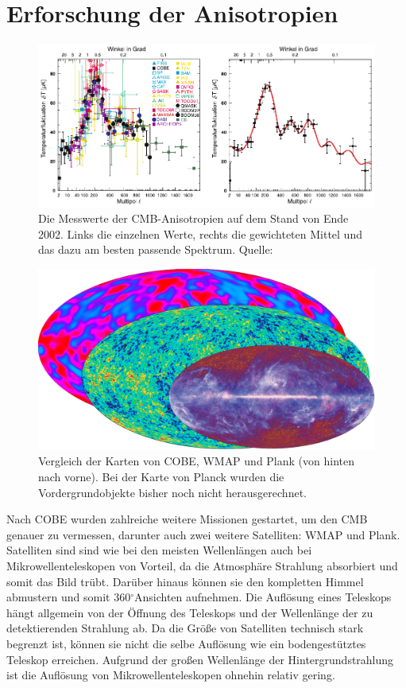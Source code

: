 \documentclass[10pt,a4paper]{article}
\newcommand{\degree}{$^\circ$}
\begin{document}
\section{Erforschung der Anisotropien}\label{Missionen}
\begin{figure}
\center
\includegraphics[scale=0.9]{mess}
\caption{Die Messwerte der CMB-Anisotropien auf dem Stand von Ende 2002. Links die einzelnen Werte, rechts die gewichteten Mittel und das dazu am besten passende Spektrum. Quelle: \cite{Schneider}}
\label{mess}
\end{figure}

\begin{figure}
\center
\includegraphics[scale=0.15]{CMB}
\caption{Vergleich der Karten von COBE, WMAP und Plank (von hinten nach vorne). Bei der Karte von Planck wurden die Vordergrundobjekte bisher noch nicht herausgerechnet.}
\label{cmb}
\end{figure}

Nach COBE wurden zahlreiche weitere Missionen gestartet, um den CMB genauer zu vermessen, darunter auch zwei weitere Satelliten: WMAP und Plank.
Satelliten sind sind wie bei den meisten Wellenlängen auch bei Mikrowellenteleskopen von Vorteil, da die Atmosphäre Strahlung absorbiert und somit das Bild trübt. Darüber hinaus können sie den kompletten Himmel abmustern und somit 360\degree Ansichten aufnehmen. Die Auflösung eines Teleskops hängt allgemein von der Öffnung des Teleskops und der Wellenlänge der zu detektierenden Strahlung ab. Da die Größe von Satelliten technisch stark begrenzt ist, können sie nicht die selbe Auflösung wie ein bodengestütztes Teleskop erreichen. Aufgrund der großen Wellenlänge der Hintergrundstrahlung ist die Auflösung von Mikrowellenteleskopen ohnehin relativ gering.
\end{document}
